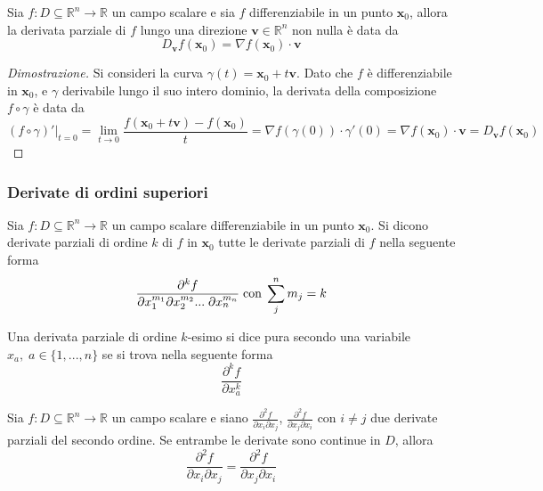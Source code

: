             \begin{proposition}
                Sia $f: D \subseteq \mathbb{R}^{n} \rightarrow \mathbb{R}$ un campo scalare e sia $f$ differenziabile in un punto $\mathbf{x}_0$, allora la derivata parziale di $f$ lungo una direzione $\mathbf{v} \in \mathbb{R}^{n}$ non nulla è data da
                \[
                    D_{\mathbf{v}} f(\mathbf{x}_0) = \nabla f (\mathbf{x}_0) \cdot \mathbf{v}
                \]
            \end{proposition}
            \begin{proof}[Dimostrazione]
                Si consideri la curva $\gamma(t) = \mathbf{x}_0 + t \mathbf{v}$. Dato che $f$ è differenziabile in $\mathbf{x}_0$, e $\gamma$ derivabile lungo il suo intero dominio, la derivata della composizione $f \circ \gamma$ è data da
                \[
                    (f \circ \gamma)'|_{t = 0} = \lim_{t \rightarrow 0} \frac{f(\mathbf{x}_0 + t \mathbf{v}) - f(\mathbf{x}_0)}{t} = \nabla f(\gamma(0)) \cdot \gamma'(0) = \nabla f (\mathbf{x}_0) \cdot \mathbf{v} = D_{\mathbf{v}} f(\mathbf{x}_0)
                \]
            \end{proof}

        \subsubsection{Derivate di ordini superiori}
            Sia $f: D \subseteq \mathbb{R}^{n} \rightarrow \mathbb{R}$ un campo scalare differenziabile in un punto $\mathbf{x}_0$. Si dicono derivate parziali di ordine $k$ di $f$ in $\mathbf{x}_0$ tutte le derivate parziali di
            $f$ nella seguente forma
            \[
                \frac{\partial^{k} f}{\partial x_1^{m_1} \partial x_2^{m_2} ... \; \partial x_n^{m_n}} \; \textnormal{con} \; \sum_{j}^{n} m_{j} = k
            \]

            Una derivata parziale di ordine $k$-esimo si dice pura secondo una variabile $x_a, \; a \in \{1, ..., n\}$ se si trova nella seguente forma
            \[
                \frac{\partial^{k} f}{\partial x_{a}^{k}}
            \]

            \begin{theorem}
                Sia $f: D \subseteq \mathbb{R}^{n} \rightarrow \mathbb{R}$ un campo scalare e siano $\displaystyle \frac{\partial^{2} f}{\partial x_i \partial x_j}$, $\displaystyle \frac{\partial^{2} f}{\partial x_j \partial x_i}$ con
                $i \neq j$ due derivate parziali del secondo ordine. Se entrambe le derivate sono continue in $D$, allora
                \[
                    \frac{\partial^{2} f}{\partial x_i \partial x_j} = \frac{\partial^{2} f}{\partial x_j \partial x_i}
                \]
            \end{theorem}

